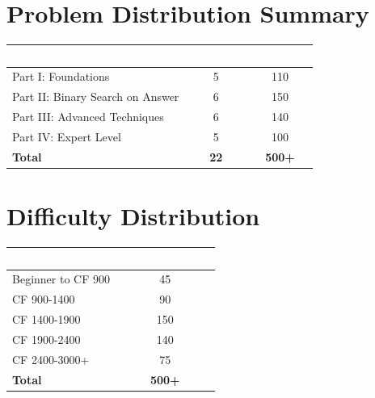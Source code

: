 \documentclass[11pt,a4paper,oneside]{book}
\begin{document}
\newpage


\chapter*{Problem Distribution Summary}

\begin{center}
\begin{tcolorbox}[
    enhanced,
    colback=white,
    colframe=primaryblue,
    boxrule=2pt,
    arc=4mm,
    width=0.9\textwidth
]
\begin{tabular}{|l|c|c|}
\hline
\rowcolor{primaryblue}
\textcolor{white}{\textbf{Part}} & \textcolor{white}{\textbf{Chapters}} & \textcolor{white}{\textbf{Problems}} \\
\hline
Part I: Foundations & 5 & 110 \\
\hline
Part II: Binary Search on Answer & 6 & 150 \\
\hline
Part III: Advanced Techniques & 6 & 140 \\
\hline
Part IV: Expert Level & 5 & 100 \\
\hline
\rowcolor{lightgray}
\textbf{Total} & \textbf{22} & \textbf{500+} \\
\hline
\end{tabular}
\end{tcolorbox}
\end{center}

\vspace{2cm}

\chapter*{Difficulty Distribution}

\begin{center}
\begin{tcolorbox}[
    enhanced,
    colback=white,
    colframe=accentorange,
    boxrule=2pt,
    arc=4mm,
    width=0.9\textwidth
]
\begin{tabular}{|l|c|}
\hline
\rowcolor{accentorange}
\textcolor{white}{\textbf{Difficulty Range}} & \textcolor{white}{\textbf{Problem Count}} \\
\hline
Beginner to CF 900 & 45 \\
\hline
CF 900-1400 & 90 \\
\hline
CF 1400-1900 & 150 \\
\hline
CF 1900-2400 & 140 \\
\hline
CF 2400-3000+ & 75 \\
\hline
\rowcolor{lightgray}
\textbf{Total} & \textbf{500+} \\
\hline
\end{tabular}
\end{tcolorbox}
\end{center}
\end{document}
